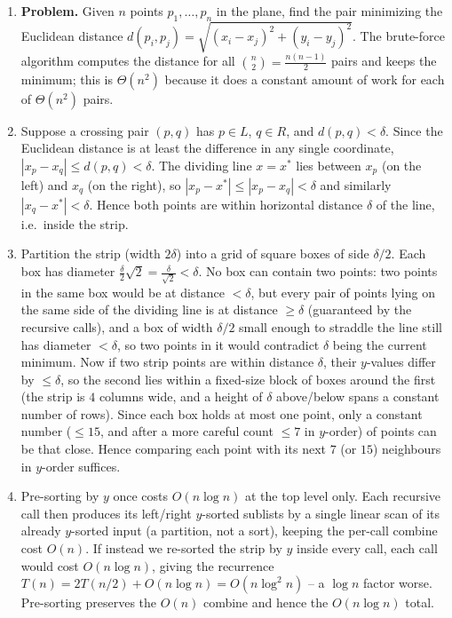 \documentclass[11pt]{article}
\begin{document}
\begin{enumerate}[label=\textbf{A\arabic*.}, leftmargin=2.2em]

\item \textbf{Problem.} Given $n$ points $p_1, \ldots, p_n$ in the plane, find the pair
minimizing the Euclidean distance $d(p_i,p_j) = \sqrt{(x_i-x_j)^2 + (y_i-y_j)^2}$. The
brute-force algorithm computes the distance for all $\binom{n}{2} = \frac{n(n-1)}{2}$ pairs
and keeps the minimum; this is $\Theta(n^2)$ because it does a constant amount of work for
each of $\Theta(n^2)$ pairs.

\item Suppose a crossing pair $(p, q)$ has $p \in L$, $q \in R$, and $d(p, q) < \delta$. Since
the Euclidean distance is at least the difference in any single coordinate, $|x_p - x_q| \le
d(p,q) < \delta$. The dividing line $x = x^*$ lies between $x_p$ (on the left) and $x_q$ (on
the right), so $|x_p - x^*| \le |x_p - x_q| < \delta$ and similarly $|x_q - x^*| < \delta$.
Hence both points are within horizontal distance $\delta$ of the line, i.e.\ inside the strip.

\item Partition the strip (width $2\delta$) into a grid of square boxes of side $\delta/2$.
Each box has diameter $\frac{\delta}{2}\sqrt{2} = \frac{\delta}{\sqrt 2} < \delta$. No box can
contain two points: two points in the same box would be at distance $< \delta$, but every
pair of points lying on the same side of the dividing line is at distance $\ge \delta$
(guaranteed by the recursive calls), and a box of width $\delta/2$ small enough to straddle
the line still has diameter $< \delta$, so two points in it would contradict $\delta$ being
the current minimum. Now if two strip points are within distance $\delta$, their $y$-values
differ by $\le \delta$, so the second lies within a fixed-size block of boxes around the
first (the strip is $4$ columns wide, and a height of $\delta$ above/below spans a constant
number of rows). Since each box holds at most one point, only a constant number ($\le 15$,
and after a more careful count $\le 7$ in $y$-order) of points can be that close. Hence
comparing each point with its next $7$ (or $15$) neighbours in $y$-order suffices.

\item Pre-sorting by $y$ once costs $O(n \log n)$ at the top level only. Each recursive call
then produces its left/right $y$-sorted sublists by a single linear scan of its already
$y$-sorted input (a partition, not a sort), keeping the per-call combine cost $O(n)$. If
instead we re-sorted the strip by $y$ inside every call, each call would cost $O(n \log n)$,
giving the recurrence $T(n) = 2T(n/2) + O(n \log n) = O(n \log^2 n)$ -- a $\log n$ factor
worse. Pre-sorting preserves the $O(n)$ combine and hence the $O(n \log n)$ total.


\end{enumerate}
\end{document}
